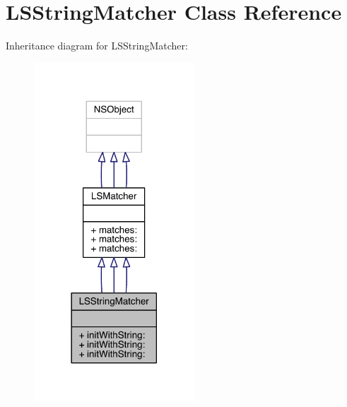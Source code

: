 \hypertarget{interface_l_s_string_matcher}{\section{L\-S\-String\-Matcher Class Reference}
\label{interface_l_s_string_matcher}
}


Inheritance diagram for L\-S\-String\-Matcher\-:\nopagebreak
\begin{figure}[H]
\begin{center}
\leavevmode
\includegraphics[width=170pt]{interface_l_s_string_matcher__inherit__graph}
\end{center}
\end{figure}


